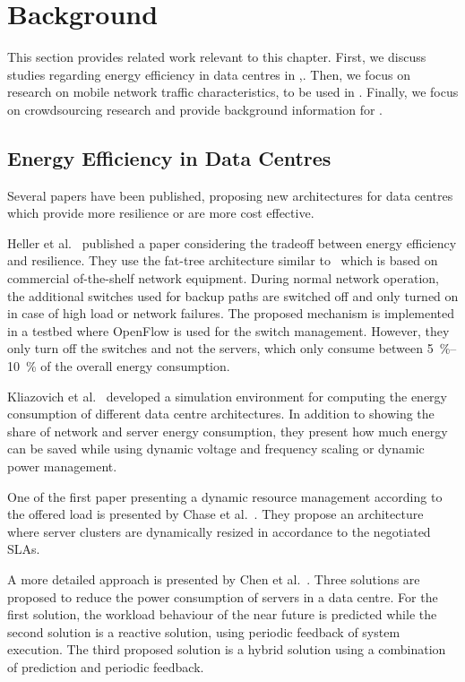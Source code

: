 \section{Background}\label{sec:cloud:related_work}
This section provides related work relevant to this chapter.
First, we discuss studies regarding energy efficiency in data centres in ,.
Then, we focus on research on mobile network traffic characteristics, to be used in .
Finally, we focus on crowdsourcing research and provide background information for .

\subsection{Energy Efficiency in Data Centres}
Several papers have been published, proposing new architectures for data centres which provide more resilience or are more cost effective\cite{Al-Fares2008, Greenberg2009a, Guo2009}.

Heller et al.~\cite{Heller2010} published a paper considering the tradeoff between energy efficiency and resilience.
They use the fat-tree architecture similar to~\cite{Al-Fares2008, Greenberg2009a} which is based on commercial of-the-shelf network equipment.
During normal network operation, the additional switches used for backup paths are switched off and only turned on in case of high load or network failures.
The proposed mechanism is implemented in a testbed where OpenFlow is used for the switch management.
However, they only turn off the switches and not the servers, which only consume between \SIrange{5}{10}{\percent} of the overall energy consumption.

Kliazovich et al.~\cite{Kliazovich2010} developed a simulation environment for computing the energy consumption of different data centre architectures. In addition to showing the share of network and server energy consumption, they present how much energy can be saved while using dynamic voltage and frequency scaling or dynamic power management.

One of the first paper presenting a dynamic resource management according to the offered load  is presented by Chase et al.~\cite{Chase2001}. They propose an architecture where server clusters are dynamically resized in accordance to the negotiated SLAs.

A more detailed approach is presented by Chen et al.~\cite{Chen2005}. Three solutions are proposed to reduce the power consumption of servers in a data centre.
For the first solution, the workload behaviour of the near future is predicted while the second solution is a reactive solution, using periodic feedback of system execution.
The third proposed solution is a hybrid solution using a combination of prediction and periodic feedback.

